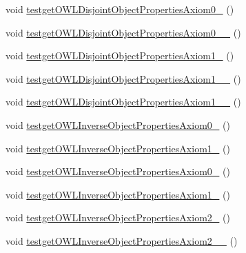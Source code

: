 \begin{DoxyCompactItemize}
\item 
void \hyperlink{classorg_1_1semanticweb_1_1owlapi_1_1api_1_1test_1_1_null_check_test_case_a3573da9b418255131b578f6ea6943f28}{testget\-O\-W\-L\-Disjoint\-Object\-Properties\-Axiom0\-\_} ()
\item 
void \hyperlink{classorg_1_1semanticweb_1_1owlapi_1_1api_1_1test_1_1_null_check_test_case_ad4fcfdff348b22d73c7e1722aecc8ecb}{testget\-O\-W\-L\-Disjoint\-Object\-Properties\-Axiom0\-\_\-\_} ()
\item 
void \hyperlink{classorg_1_1semanticweb_1_1owlapi_1_1api_1_1test_1_1_null_check_test_case_a08080104f182fc966a55588380362ed7}{testget\-O\-W\-L\-Disjoint\-Object\-Properties\-Axiom1\-\_} ()
\item 
void \hyperlink{classorg_1_1semanticweb_1_1owlapi_1_1api_1_1test_1_1_null_check_test_case_aa22a8b5fe9af885014ba9059e7ec8685}{testget\-O\-W\-L\-Disjoint\-Object\-Properties\-Axiom1\-\_\-\_} ()
\item 
void \hyperlink{classorg_1_1semanticweb_1_1owlapi_1_1api_1_1test_1_1_null_check_test_case_a6fc91461f30ab0e8e65905b8386e25f5}{testget\-O\-W\-L\-Disjoint\-Object\-Properties\-Axiom1\-\_\-\_} ()
\item 
void \hyperlink{classorg_1_1semanticweb_1_1owlapi_1_1api_1_1test_1_1_null_check_test_case_a0cb2570006af06e4acea3a2bdc8a88ce}{testget\-O\-W\-L\-Inverse\-Object\-Properties\-Axiom0\-\_} ()
\item 
void \hyperlink{classorg_1_1semanticweb_1_1owlapi_1_1api_1_1test_1_1_null_check_test_case_a7050b096813fdf63066a967b5f6695c1}{testget\-O\-W\-L\-Inverse\-Object\-Properties\-Axiom1\-\_} ()
\item 
void \hyperlink{classorg_1_1semanticweb_1_1owlapi_1_1api_1_1test_1_1_null_check_test_case_acc351ca754bde13083ee5549e35aa6d1}{testget\-O\-W\-L\-Inverse\-Object\-Properties\-Axiom0\-\_} ()
\item 
void \hyperlink{classorg_1_1semanticweb_1_1owlapi_1_1api_1_1test_1_1_null_check_test_case_afc054a74089a07b84cccfc3bd2f2465e}{testget\-O\-W\-L\-Inverse\-Object\-Properties\-Axiom1\-\_} ()
\item 
void \hyperlink{classorg_1_1semanticweb_1_1owlapi_1_1api_1_1test_1_1_null_check_test_case_ab7bc6d3a3b4d9a53fe8d9c0114208e66}{testget\-O\-W\-L\-Inverse\-Object\-Properties\-Axiom2\-\_} ()
\item 
void \hyperlink{classorg_1_1semanticweb_1_1owlapi_1_1api_1_1test_1_1_null_check_test_case_ac68025766beb62ac5adeaa1afc42d1fe}{testget\-O\-W\-L\-Inverse\-Object\-Properties\-Axiom2\-\_\-\_} ()

\end{DoxyCompactItemize}
